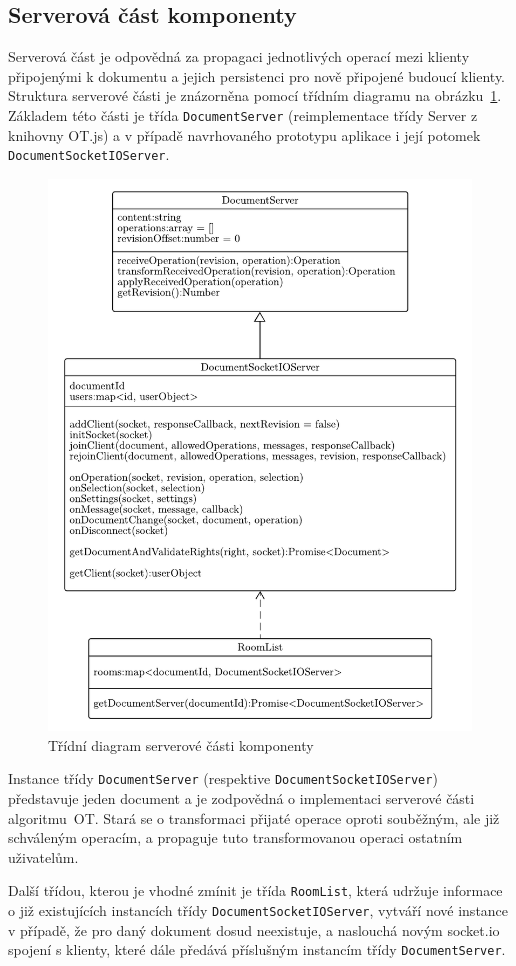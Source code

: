 

\subsection{Serverová část komponenty}\label{subsec:serverováČást}

Serverová část je odpovědná za propagaci jednotlivých operací mezi klienty připojenými k dokumentu a jejich persistenci pro nově připojené budoucí klienty.
Struktura serverové části je znázorněna pomocí třídním diagramu na obrázku~\ref{fig:DocumentServer}.
Základem této části je třída \texttt{DocumentServer} (reimplementace třídy Server z knihovny OT.js) a v případě navrhovaného prototypu aplikace i její potomek \texttt{DocumentSocketIOServer}.

\begin{figure}[ht!]
    \centering
    \includegraphics[width=.8\textwidth]{partials/navrh/editor/DocumentServer.pdf}
    \caption{Třídní diagram serverové části komponenty}\label{fig:DocumentServer}
\end{figure}

Instance třídy \texttt{DocumentServer} (respektive \texttt{DocumentSocketIOServer}) představuje jeden document a je zodpovědná o implementaci serverové části algoritmu~\gls{OT}.
Stará se o transformaci přijaté operace oproti souběžným, ale již schváleným operacím, a propaguje tuto transformovanou operaci ostatním uživatelům.

Další třídou, kterou je vhodné zmínit je třída \texttt{RoomList}, která udržuje informace o již existujících instancích třídy \texttt{DocumentSocketIOServer}, vytváří nové instance v případě, že pro daný dokument dosud neexistuje, a naslouchá novým socket.io spojení s klienty, které dále předává příslušným instancím třídy \texttt{DocumentServer}.
